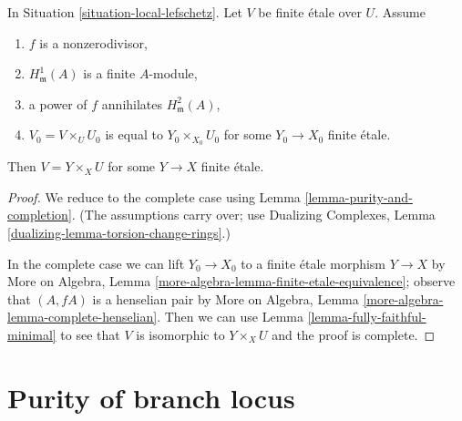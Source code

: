 \begin{lemma}
\label{lemma-lift-purity-general}
In Situation \ref{situation-local-lefschetz}.
Let $V$ be finite \'etale over $U$. Assume
\begin{enumerate}
\item $f$ is a nonzerodivisor,
\item $H^1_\mathfrak m(A)$ is a finite $A$-module,
\item a power of $f$ annihilates $H^2_\mathfrak m(A)$,
\item $V_0 = V \times_U U_0$ is equal to $Y_0 \times_{X_0} U_0$
for some $Y_0 \to X_0$ finite \'etale.
\end{enumerate}
Then $V = Y \times_X U$ for some $Y \to X$ finite \'etale.
\end{lemma}

\begin{proof}
We reduce to the complete case using Lemma \ref{lemma-purity-and-completion}.
(The assumptions carry over; use Dualizing Complexes, Lemma
\ref{dualizing-lemma-torsion-change-rings}.)

\medskip\noindent
In the complete case we can lift $Y_0 \to X_0$ to a finite \'etale
morphism $Y \to X$ by
More on Algebra, Lemma \ref{more-algebra-lemma-finite-etale-equivalence};
observe that $(A, fA)$ is a henselian pair by
More on Algebra, Lemma \ref{more-algebra-lemma-complete-henselian}.
Then we can use Lemma \ref{lemma-fully-faithful-minimal}
to see that $V$ is isomorphic to $Y \times_X U$ and
the proof is complete.
\end{proof}










\section{Purity of branch locus}
\label{section-purity}

